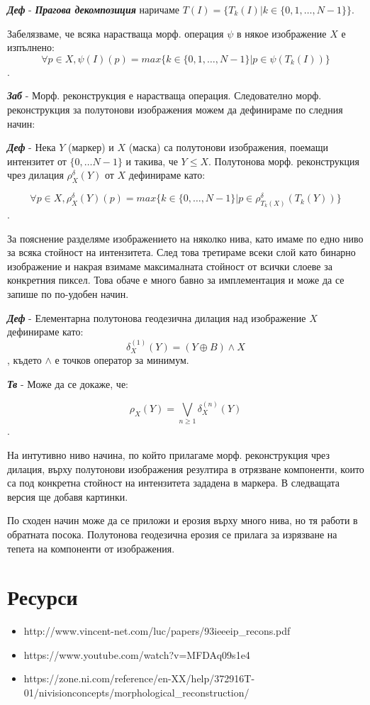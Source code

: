 \documentclass[fleqn,12pt]{article}
\begin{document}
\bigbreak

\textbf{\textit{Деф}} - \textit{\textbf{Прагова декомпозиция}} наричаме $T(I) = \{T_k(I) | k \in \{0, 1, \dots, N-1\}\}$.

\bigbreak

Забелязваме, че всяка нарастваща морф. операция $\psi$ в някое изображение $X$ е изпълнено:
$$\forall p \in X, \psi(I)(p) = max\{k \in \{0, 1, \dots, N-1\} | p \in \psi(T_k(I))\}$$.

\bigbreak \textbf{\textit{Заб}} - Морф. реконструкция е нарастваща операция. Следователно морф. реконструкция за полутонови изображения можем да дефинираме по следния начин:

\bigbreak

\textbf{\textit{Деф}} - Нека $Y$ (маркер) и $X$ (маска) са полутонови изображения, поемащи интензитет от $\{0, \dots N-1\}$ и такива, че $Y \leq X$. Полутонова морф. реконструкция чрез дилация $\rho_X^\delta (Y)$ от $X$ дефинираме като:

$$\forall p \in X, \rho_X^\delta (Y)(p) = max\{k \in \{0, \dots, N-1\} | p \in \rho_{T_k(X)}^\delta (T_k(Y))\}$$.

\bigbreak

За пояснение разделяме изображението на няколко нива, като имаме по едно ниво за всяка стойност на интензитета. След това третираме всеки слой като бинарно изображение и накрая взимаме максималната стойност от всички слоеве за конкретния пиксел. Това обаче е много бавно за имплементация и може да се запише по по-удобен начин.

\bigbreak

\textbf{\textit{Деф}} - Елементарна полутонова геодезична дилация над изображение $X$ дефинираме като:
$$\delta_X^{(1)} (Y) = (Y \oplus B) \land X$$, където $\land$ е точков оператор за минимум.

\bigbreak

\textbf{\textit{Тв}} - Може да се докаже, че:

$$ \rho_X (Y) = \bigvee\limits_{n \geq 1} \delta_X^{(n)} (Y)$$.

\bigbreak

На интутивно ниво начина, по който прилагаме морф. реконструкция чрез дилация, върху полутонови изображения резултира в отрязване компоненти, които са под конкретна стойност на интензитета зададена в маркера. В следващата версия ще добавя картинки.

\bigbreak

По сходен начин може да се приложи и ерозия върху много нива, но тя работи в обратната посока. Полутонова геодезична ерозия се прилага за изрязване на тепета на компоненти от изображения.

\section{Ресурси}

\begin{itemize}
    \item http://www.vincent-net.com/luc/papers/93ieeeip\_recons.pdf
    \item https://www.youtube.com/watch?v=MFDAq09s1e4
    \item https://zone.ni.com/reference/en-XX/help/372916T-01/nivisionconcepts/morphological\_reconstruction/
\end{itemize}
\end{document}
